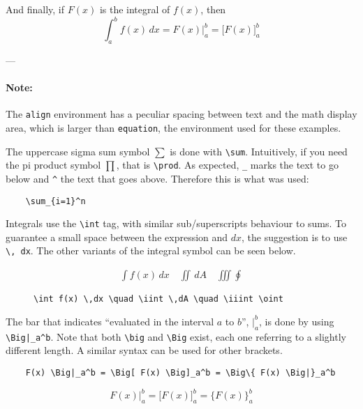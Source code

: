 And finally, if \( F(x) \) is the integral of \( f(x) \), then
\begin{equation*}
    \int_a^b f(x) \,dx = F(x)\Big|_a^b = \Big[F(x)\Big]_a^b
\end{equation*}

---

\paragraph{Note:}
The \verb|align| environment has a peculiar spacing between text and the math display area, which is larger than \verb|equation|, the environment used for these examples.

The uppercase sigma sum symbol \( \sum \) is done with \verb|\sum|.
Intuitively, if you need the pi product symbol \( \prod \), that is \verb|\prod|.
As expected, \verb|_| marks the text to go below and \verb|^| the text that goes above.
Therefore this is what was used: 
\begin{lstlisting}
    \sum_{i=1}^n
\end{lstlisting} 

Integrals use the \verb|\int| tag, with similar sub/superscripts behaviour to sums.
To guarantee a small space between the expression and \( dx \), the suggestion is to use \verb|\, dx|.
The other variants of the integral symbol can be seen below.
\begin{figure}[h]
\begin{minipage}{0.40\textwidth}
    \begin{align*}
        \int f(x) \,dx \quad \iint \,dA \quad \iiint \oint 
    \end{align*}
\end{minipage}
\hfill
\begin{minipage}{0.55\textwidth}
\begin{lstlisting}
\int f(x) \,dx \quad \iint \,dA \quad \iiint \oint 
\end{lstlisting}
\end{minipage}
\centering
\end{figure}

The bar that indicates ``evaluated in the interval \( a \) to \( b \)'', \( \Big|_a^b \), is done by using \verb!\Big|_a^b!.
Note that both \verb|\big| and \verb|\Big| exist, each one referring to a slightly different length. 
A similar syntax can be used for other brackets.
\begin{lstlisting}
    F(x) \Big|_a^b = \Big[ F(x) \Big]_a^b = \Big\{ F(x) \Big|}_a^b
\end{lstlisting}
\begin{equation*}
    F(x) \Big|_a^b = \Big[ F(x) \Big]_a^b = \Big \{ F(x) \Big \}_a^b
\end{equation*} 

